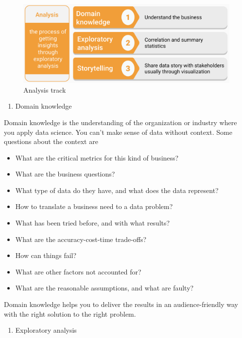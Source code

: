 \documentclass[
  12pt,
]{krantz}
\providecommand{\tightlist}{%
  \setlength{\itemsep}{0pt}\setlength{\parskip}{0pt}}
\begin{document}
\begin{figure}

{\centering \includegraphics[width=0.8\linewidth]{images/track2_analysis} 

}

\caption{Analysis track}\label{fig:track2analysis}
\end{figure}

\begin{enumerate}
\def\labelenumi{(\arabic{enumi})}
\tightlist
\item
  Domain knowledge
\end{enumerate}

Domain knowledge is the understanding of the organization or industry where you apply data science. You can't make sense of data without context. Some questions about the context are

\begin{itemize}
\tightlist
\item
  What are the critical metrics for this kind of business?
\item
  What are the business questions?
\item
  What type of data do they have, and what does the data represent?
\item
  How to translate a business need to a data problem?
\item
  What has been tried before, and with what results?
\item
  What are the accuracy-cost-time trade-offs?
\item
  How can things fail?
\item
  What are other factors not accounted for?
\item
  What are the reasonable assumptions, and what are faulty?
\end{itemize}

Domain knowledge helps you to deliver the results in an audience-friendly way with the right solution to the right problem.

\begin{enumerate}
\def\labelenumi{(\arabic{enumi})}
\setcounter{enumi}{1}
\tightlist
\item
  Exploratory analysis
\end{enumerate}
\end{document}
